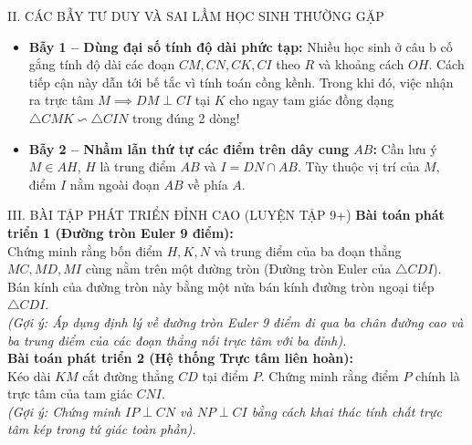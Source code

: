 \documentclass[11pt,a4paper]{article}
\begin{document}
\begin{pedagogybox}{II. CÁC BẪY TƯ DUY VÀ SAI LẦM HỌC SINH THƯỜNG GẶP}
\begin{itemize}[leftmargin=*, nosep]
    \item \textbf{Bẫy 1 -- Dùng đại số tính độ dài phức tạp:} Nhiều học sinh ở câu b cố gắng tính độ dài các đoạn $CM, CN, CK, CI$ theo $R$ và khoảng cách $OH$. Cách tiếp cận này dẫn tới bế tắc vì tính toán cồng kềnh. Trong khi đó, việc nhận ra trực tâm $M \implies DM \perp CI$ tại $K$ cho ngay tam giác đồng dạng $\triangle CMK \backsim \triangle CIN$ trong đúng 2 dòng!
    \item \textbf{Bẫy 2 -- Nhầm lẫn thứ tự các điểm trên dây cung $AB$:} Cần lưu ý $M \in AH$, $H$ là trung điểm $AB$ và $I = DN \cap AB$. Tùy thuộc vị trí của $M$, điểm $I$ nằm ngoài đoạn $AB$ về phía $A$.
\end{itemize}
\end{pedagogybox}

\vspace{1mm}

\begin{exercisebox}{III. BÀI TẬP PHÁT TRIỂN ĐỈNH CAO (LUYỆN TẬP 9+)}
\textbf{Bài toán phát triển 1 (Đường tròn Euler 9 điểm):}\\
Chứng minh rằng bốn điểm $H, K, N$ và trung điểm của ba đoạn thẳng $MC, MD, MI$ cùng nằm trên một đường tròn (Đường tròn Euler của $\triangle CDI$). Bán kính của đường tròn này bằng một nửa bán kính đường tròn ngoại tiếp $\triangle CDI$.\\[1mm]
\textit{(Gợi ý: Áp dụng định lý về đường tròn Euler 9 điểm đi qua ba chân đường cao và ba trung điểm của các đoạn thẳng nối trực tâm với ba đỉnh).}\\[2mm]
\textbf{Bài toán phát triển 2 (Hệ thống Trực tâm liên hoàn):}\\
Kéo dài $KM$ cắt đường thẳng $CD$ tại điểm $P$. Chứng minh rằng điểm $P$ chính là trực tâm của tam giác $CNI$.\\[1mm]
\textit{(Gợi ý: Chứng minh $IP \perp CN$ và $NP \perp CI$ bằng cách khai thác tính chất trực tâm kép trong tứ giác toàn phần).}
\end{exercisebox}
\end{document}
